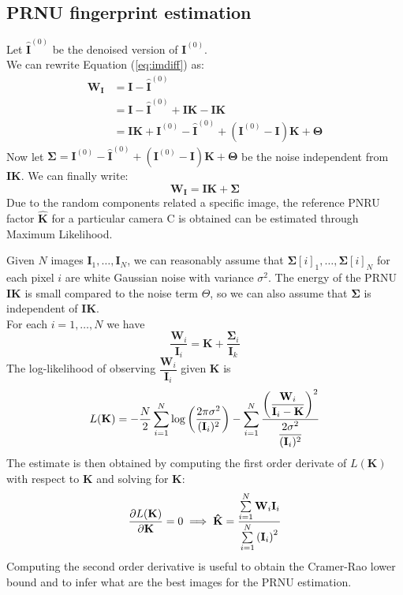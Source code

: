 \documentclass[a4paper, 11pt]{article}
\begin{document}
\subsection*{PRNU fingerprint estimation}
Let $ \mathbf{\hat{I}}^{(0)}$ be the denoised version of $\mathbf{I}^{(0)}$.\\
We can rewrite Equation (\ref{eq:imdiff}) as:
\begin{align}
\mathbf{W_I} & = \mathbf{I}- \mathbf{\hat{I}}^{(0)} \nonumber \\
& = \mathbf{I}- \mathbf{\hat{I}}^{(0)} + \mathbf{I} \mathbf{K} - \mathbf{I} \mathbf{K} \nonumber \\
& = \mathbf{I} \mathbf{K} + \mathbf{I}^{(0)} - \mathbf{\hat{I}}^{(0)} + \left( \mathbf{I}^{(0)}-\mathbf{I} \right) \mathbf{K} + \mathbf{\Theta}
\end{align}
Now let $\mathbf{\Sigma} = \mathbf{I}^{(0)} - \mathbf{\hat{I}}^{(0)} + \left( \mathbf{I}^{(0)}-\mathbf{I} \right) \mathbf{K} + \mathbf{\Theta}$ be the noise independent from $\mathbf{IK}$. We can finally write:
\begin{equation}
\mathbf{W_I} = \mathbf{I} \mathbf{K} + \mathbf{\Sigma}
\end{equation}
Due to the random components related a specific image, the reference PNRU factor $\mathbf{\hat{K}}$ for a particular camera C is obtained can be estimated through Maximum Likelihood.

Given $N$ images $\mathbf{I}_1, \dots, \mathbf{I}_N$, we can reasonably assume that $\mathbf{\Sigma}[i]_1, \dots, \mathbf{\Sigma}[i]_N$ for each pixel $i$ are white Gaussian noise with variance $\sigma^2$. The energy of the PRNU $\mathbf{I} \mathbf{K}$ is small compared to the noise term $\Theta$, so we can also assume that $\mathbf{\Sigma}$ is independent of $\mathbf{I} \mathbf{K}$.\\
For each $i=1,\dots,N$ we have
\begin{equation*}
\dfrac{\mathbf{W}_i}{\mathbf{I}_i} = \mathbf{K} + \dfrac{\mathbf{\Sigma}_i}{\mathbf{I}_k}
\end{equation*}
The log-likelihood of observing $\dfrac{\mathbf{W}_i}{\mathbf{I}_i}$ given $\mathbf{K}$ is
\begin{equation}
L(\mathbf{K}) =-\dfrac{N}{2} \sum_{i=1}^{N}\log\left( \dfrac{2\pi\sigma^{2}}{({\bf I}_{i})^{2}}\right)-\sum_{i=1}^{N}{ \frac{\left(\dfrac{{\bf W}_{i}}{{\mathbf I}_{i}-{\bf K}}\right)^{2}}{\dfrac{2\sigma^{2}}{({\mathbf I}_{i})^{2}}}}
\end{equation}
The estimate is then obtained by computing the first order derivate of $L(\mathbf{K})$ with respect to $\mathbf{K}$ and solving for $\mathbf{K}$:
\begin{equation*}
\dfrac{\partial L(\mathbf{K})}{\partial{\bf K}} = 0 \implies \mathbf{\hat{K}} = \dfrac{\sum\limits_{i=1}^{N} \mathbf{W}_i \mathbf{I}_i}{\sum\limits_{i=1}^{N} \left( \mathbf{I}_i \right) ^2}
\end{equation*}
Computing the second order derivative is useful to obtain the Cramer-Rao lower bound and to infer what are the best images for the PRNU estimation.
\end{document}

